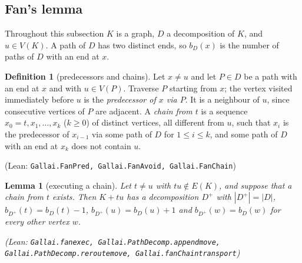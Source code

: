 \documentclass[11pt]{amsart}
\newtheorem{lemma}[theorem]{Lemma}
\theoremstyle{definition}
\newtheorem{definition}[theorem]{Definition}
\theoremstyle{remark}
\renewcommand{\_}{\oldunderscore\allowbreak}
\newcommand{\leanst}[1]{\par{\raggedright\small\textup{(Lean: \texttt{#1})}\par}}
\begin{document}
\subsection{Fan's lemma}
Throughout this subsection $K$ is a graph, $D$ a decomposition of $K$, and $u\in V(K)$. A path
of $D$ has two distinct ends, so $b_D(x)$ is the number of paths of $D$ with an end at $x$.

\begin{definition}[predecessors and chains]\label{def:chain}
Let $x\ne u$ and let $P\in D$ be a path with an end at $x$ and with $u\in V(P)$. Traverse $P$
starting from $x$; the vertex visited immediately before $u$ is the \emph{predecessor of $x$ via
$P$}. It is a neighbour of $u$, since consecutive vertices of $P$ are adjacent. A \emph{chain from
$t$} is a sequence $x_0=t,x_1,\dots,x_k$ ($k\ge0$) of distinct vertices, all different from $u$, such
that $x_i$ is the predecessor of $x_{i-1}$ via some path of $D$ for $1\le i\le k$, and some path of
$D$ with an end at $x_k$ does not contain $u$.
\leanst{Gallai.FanPred, Gallai.FanAvoid, Gallai.FanChain}
\end{definition}

\begin{lemma}[executing a chain]\label{lem:chain-exec}
Let $t\ne u$ with $tu\notin E(K)$, and suppose that a chain from $t$ exists. Then $K+tu$ has a
decomposition $D^+$ with $|D^+|=|D|$, $b_{D^+}(t)=b_D(t)-1$, $b_{D^+}(u)=b_D(u)+1$ and
$b_{D^+}(w)=b_D(w)$ for every other vertex $w$.
\leanst{Gallai.fan\_exec, Gallai.PathDecomp.append\_move, Gallai.PathDecomp.reroute\_move,
Gallai.fanChain\_transport}
\end{lemma}
\end{document}
